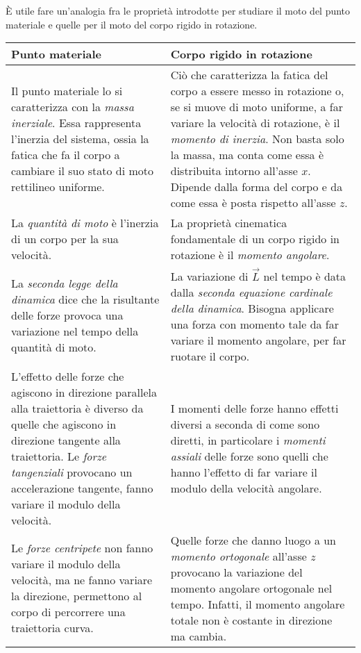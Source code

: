 \documentclass[10pt,a4paper]{book}
\begin{document}
È utile fare un'analogia fra le proprietà introdotte per studiare il moto del punto materiale e quelle per il moto del corpo rigido in rotazione.
\begin{table}[H]
	\centering
	\begin{tabular}{|p{6.5cm}|p{6.5cm}|}
		\hline
		Punto materiale & Corpo rigido in rotazione \\
		\hline
		Il punto materiale lo si caratterizza con la \emph{massa inerziale}. Essa rappresenta l'inerzia del sistema, ossia la fatica che fa il corpo a cambiare il suo stato di moto rettilineo uniforme. & Ciò che caratterizza la fatica del corpo a essere messo in rotazione o, se si muove di moto uniforme, a far variare la velocità di rotazione, è il \emph{momento di inerzia}. Non basta solo la massa, ma conta come essa è distribuita intorno all'asse $x$. Dipende dalla forma del corpo e da come essa è posta rispetto all'asse $z$. \\
		\hline
		La \emph{quantità di moto} è l'inerzia di un corpo per la sua velocità. & La proprietà cinematica fondamentale di un corpo rigido in rotazione è il \emph{momento angolare}.\\
		\hline
		La \emph{seconda legge della dinamica} dice che la risultante delle forze provoca una variazione nel tempo della quantità di moto. & La variazione di $\vec{L}$ nel tempo è data dalla \emph{seconda equazione cardinale della dinamica}. Bisogna applicare una forza con momento tale da far variare il momento angolare, per far ruotare il corpo.\\
		\hline
		L'effetto delle forze che agiscono in direzione parallela alla traiettoria è diverso da quelle che agiscono in direzione tangente alla traiettoria. Le \emph{forze tangenziali} provocano un accelerazione tangente, fanno variare il modulo della velocità. & I momenti delle forze hanno effetti diversi a seconda di come sono diretti, in particolare i \emph{momenti assiali} delle forze sono quelli che hanno l'effetto di far variare il modulo della velocità angolare. \\
		\hline
		Le \emph{forze centripete} non fanno variare il modulo della velocità, ma ne fanno variare la direzione, permettono al corpo di percorrere una traiettoria curva. & Quelle forze che danno luogo a un \emph{momento ortogonale} all'asse $z$ provocano la variazione del momento angolare ortogonale nel tempo. Infatti, il momento angolare totale non è costante in direzione ma cambia.\\
		\hline
	\end{tabular}
\end{table}
\end{document}
